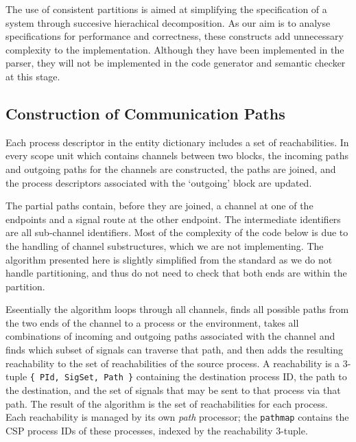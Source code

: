 The use of consistent partitions is aimed at simplifying the
specification of a system through succesive hierachical 
decomposition.
As our aim is to analyse specifications for
performance and correctness, these constructs add unnecessary
complexity to the implementation. 
Although they have been implemented
in the parser, they will not be implemented in the code generator
and semantic checker at this stage.

\subsection{Construction of Communication Paths}

Each process descriptor in the entity dictionary includes a set of
reachabilities.
In every scope unit which contains channels between
two blocks, the incoming paths and outgoing paths
for the channels are constructed, the paths are joined, and the
process descriptors associated with the `outgoing' block are updated.

The partial paths contain, before they are joined, a channel at one
of the endpoints and a signal route at the other endpoint. 
The intermediate identifiers are all sub-channel identifiers.
Most of the complexity of the code below is due to the handling
of channel substructures, which we are not implementing.
The algorithm presented here is slightly simplified from the standard
as we do not handle partitioning, and thus do not need to check that
both ends are within the partition.

Eseentially the algorithm loops through all channels, finds all
possible paths from the two ends of the channel to a process or
the environment, takes all combinations of incoming and outgoing
paths associated with the channel and finds which subset of signals
can traverse that path, and then adds the resulting reachability to
the set of reachabilities of the source process.
A reachability is a 3-tuple {\tt \{ PId, SigSet, Path \}}
containing the destination process ID, the path to the destination,
and the set of signals that may be sent to that process via that
path. 
The result of the algorithm is the set of reachabilities for
each process. 
Each reachability is managed by its own {\em path} processor;
the {\tt pathmap} contains the CSP process IDs of these
processes, indexed by the reachability 3-tuple.

